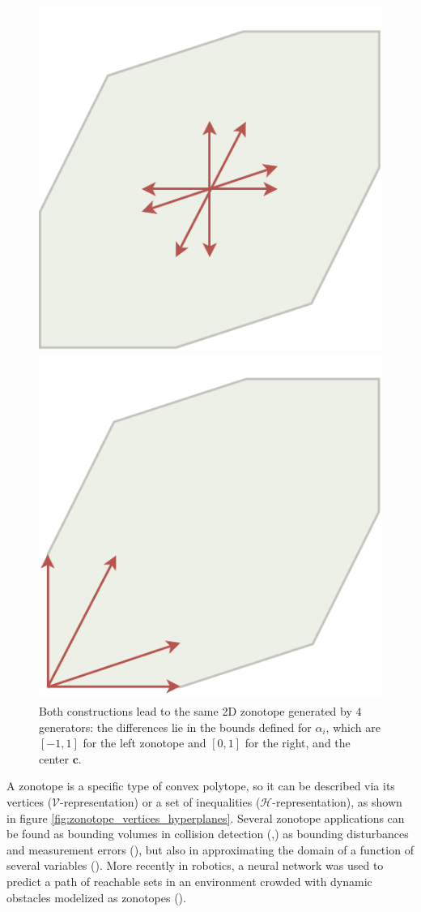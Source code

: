 \begin{figure}[!htb]
    \captionsetup{justification=centering}
    \begin{minipage}{0.49\linewidth}
        \centering
        \includegraphics[trim={0 0 0 0},clip, width=0.6\linewidth]{img/chapter_2/zonotope_2d_4g.pdf}
    \end{minipage}
    \hfill
    \begin{minipage}{0.49\linewidth}
        \centering
        \includegraphics[trim={0 0 0 0},clip,width=0.6\linewidth]{img/chapter_2/zonotope_2d_4g_alt.pdf}
    \end{minipage}
    \caption{Both constructions lead to the same 2D zonotope generated by $4$ generators: the differences lie in the bounds defined for $\alpha_i$, which are $[-1,1]$ for the left zonotope and $[0, 1]$ for the right, and the center $\mathbf{c}$.}
    \label{fig:a_simple_zonotope}
\end{figure}

A zonotope is a specific type of convex polytope, so it can be described via its vertices ($\mathcal{V}$-representation) or a set of inequalities ($\mathcal{H}$-representation), as shown in figure \ref{fig:zonotope_vertices_hyperplanes}. Several zonotope applications can be found as bounding volumes in collision detection (\cite{guibasZonotopesBoundingVolumes},) as bounding disturbances and measurement errors (\cite{scottInputDesignGuaranteed2014}), but also in approximating the domain of a function of several variables (\cite{stinsonRandomizedAlgorithmEnumerating2016}).
More recently in robotics, a neural network was used to predict a path of reachable sets in an environment crowded with dynamic obstacles modelized as zonotopes (\cite{shamsahSociallyAcceptableBipedal2024}).

